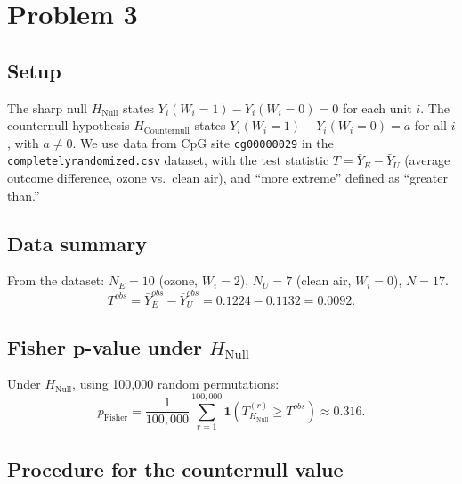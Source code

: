 \documentclass[11pt]{article}
\begin{document}
\section*{Problem 3}

\subsection*{Setup}

The sharp null $H_{\text{Null}}$ states $Y_i(W_i=1) - Y_i(W_i=0) = 0$ for each unit $i$. The counternull hypothesis $H_{\text{Counternull}}$ states $Y_i(W_i=1) - Y_i(W_i=0) = a$ for all $i$, with $a \neq 0$. We use data from CpG site \texttt{cg00000029} in the \texttt{completelyrandomized.csv} dataset, with the test statistic $T = \bar{Y}_E - \bar{Y}_U$ (average outcome difference, ozone vs.\ clean air), and ``more extreme'' defined as ``greater than.''

\subsection*{Data summary}

From the dataset: $N_E = 10$ (ozone, $W_i=2$), $N_U = 7$ (clean air, $W_i=0$), $N = 17$.
\[
  T^{obs} = \bar{Y}_E^{obs} - \bar{Y}_U^{obs} = 0.1224 - 0.1132 = 0.0092.
\]

\subsection*{Fisher p-value under $H_{\text{Null}}$}

Under $H_{\text{Null}}$, using 100,000 random permutations:
\[
  p_{\text{Fisher}} = \frac{1}{100{,}000}\sum_{r=1}^{100{,}000}\mathbf{1}(T^{(r)}_{H_{\text{Null}}} \geq T^{obs}) \approx 0.316.
\]

\subsection*{Procedure for the counternull value}
\end{document}

